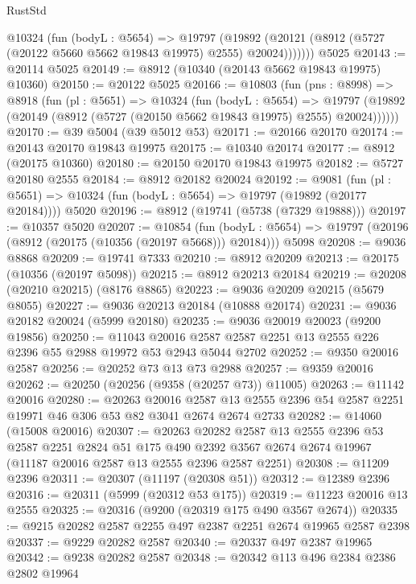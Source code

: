 \begin{lexlean}{RustStd}
\begin{coremodule}
        @10324
          (fun (bodyL : @5654) =>
          @19797
            (@19892 (@20121 (@8912 (@5727 (@20122 @5660 @5662 @19843 @19975) @2555) @20024)))))))
    @5025
@20143 := @20114 @5025
@20149 := @8912 (@10340 (@20143 @5662 @19843 @19975) @10360)
@20150 := @20122 @5025
@20166 := @10803
    (fun (pns : @8998) =>
    @8918
      (fun (pl : @5651) =>
      @10324
        (fun (bodyL : @5654) =>
        @19797 (@19892 (@20149 (@8912 (@5727 (@20150 @5662 @19843 @19975) @2555) @20024))))))
@20170 := @39 @5004 (@39 @5012 @53)
@20171 := @20166 @20170
@20174 := @20143 @20170 @19843 @19975
@20175 := @10340 @20174
@20177 := @8912 (@20175 @10360)
@20180 := @20150 @20170 @19843 @19975
@20182 := @5727 @20180 @2555
@20184 := @8912 @20182 @20024
@20192 := @9081
    (fun (pl : @5651) => @10324 (fun (bodyL : @5654) => @19797 (@19892 (@20177 @20184))))
    @5020
@20196 := @8912 (@19741 (@5738 (@7329 @19888)))
@20197 := @10357 @5020
@20207 := @10854
    (fun (bodyL : @5654) => @19797 (@20196 (@8912 (@20175 (@10356 (@20197 @5668))) @20184)))
    @5098
@20208 := @9036 @8868
@20209 := @19741 @7333
@20210 := @8912 @20209
@20213 := @20175 (@10356 (@20197 @5098))
@20215 := @8912 @20213 @20184
@20219 := @20208 (@20210 @20215) (@8176 @8865)
@20223 := @9036 @20209 @20215 (@5679 @8055)
@20227 := @9036 @20213 @20184 (@10888 @20174)
@20231 := @9036 @20182 @20024 (@5999 @20180)
@20235 := @9036 @20019 @20023 (@9200 @19856)
@20250 := @11043
    @20016
    @2587
    @2587
    @2251
    @13
    @2555
    @226
    @2396
    @55
    @2988
    @19972
    @53
    @2943
    @5044
    @2702
@20252 := @9350 @20016 @2587
@20256 := @20252 @73 @13 @73 @2988
@20257 := @9359 @20016
@20262 := @20250 (@20256 (@9358 (@20257 @73)) @11005)
@20263 := @11142 @20016
@20280 := @20263
    @20016
    @2587
    @13
    @2555
    @2396
    @54
    @2587
    @2251
    @19971
    @46
    @306
    @53
    @82
    @3041
    @2674
    @2674
    @2733
@20282 := @14060 (@15008 @20016)
@20307 := @20263
    @20282
    @2587
    @13
    @2555
    @2396
    @53
    @2587
    @2251
    @2824
    @51
    @175
    @490
    @2392
    @3567
    @2674
    @2674
    @19967
    (@11187 @20016 @2587 @13 @2555 @2396 @2587 @2251)
@20308 := @11209 @2396
@20311 := @20307 (@11197 (@20308 @51))
@20312 := @12389 @2396
@20316 := @20311 (@5999 (@20312 @53 @175))
@20319 := @11223 @20016 @13 @2555
@20325 := @20316 (@9200 (@20319 @175 @490 @3567 @2674))
@20335 := @9215 @20282 @2587 @2255 @497 @2387 @2251 @2674 @19965 @2587 @2398
@20337 := @9229 @20282 @2587
@20340 := @20337 @497 @2387 @19965
@20342 := @9238 @20282 @2587
@20348 := @20342 @113 @496 @2384 @2386 @2802 @19964

\end{coremodule}
\end{lexlean}
